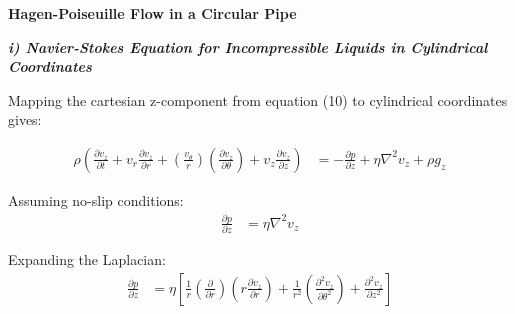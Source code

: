 \documentclass[titlepage]{article}
\begin{document}
\newpage
\begin{center}
    \large
    \textbf{Hagen-Poiseuille Flow in a Circular Pipe} \\
\end{center}

\normalsize
\begin{center}
    \textbf{\emph{i) Navier-Stokes Equation for Incompressible Liquids in Cylindrical Coordinates}}
\end{center}

\noindent Mapping the cartesian z-component from equation (10) to cylindrical coordinates gives: 

\begin{align}
    \rho\left(\displaystyle\frac{\partial{v_{z}}}{\partial{t}}+v_{r}\displaystyle\frac{\partial{v_{z}}}{\partial{r}}+\left(\displaystyle\frac{v_{\theta}}{r}\right)\left(\displaystyle\frac{\partial{v_{z}}}{\partial{\theta}}\right)+v_{z}\displaystyle\frac{\partial{v_{z}}}{\partial{z}}\right)&=-\displaystyle\frac{\partial{p}}{\partial{z}}+\eta\nabla^2v_{z}+\rho{g_{z}}
\end{align}

\noindent Assuming no-slip conditions:
\begin{align}    
    \displaystyle\frac{\partial{p}}{\partial{z}}&=\eta\nabla^2v_{z}
\end{align}

\noindent Expanding the Laplacian: 
\begin{align}    
    \displaystyle\frac{\partial{p}}{\partial{z}}&=\eta\left[\displaystyle\frac{1}{r}\left(\displaystyle\frac{\partial}{\partial{r}}\right)\left(r\displaystyle\frac{\partial{v_{z}}}{\partial{r}}\right)+\displaystyle\frac{1}{r^2}\left(\displaystyle\frac{\partial^2{v_{z}}}{\partial{\theta^2}}\right)+\displaystyle\frac{\partial^2{v_{z}}}{\partial{z^2}}\right]
\end{align}
\end{document}
